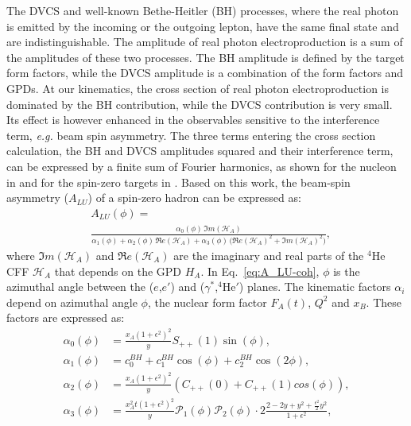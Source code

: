 \documentclass[twocolumn,nofootinbib,showpacs,prl,superscriptaddress,secnumarabic,amssymb,nobibnotes,aps,floatfix]{revtex4}
\begin{document}
The DVCS and well-known Bethe-Heitler (BH) processes, where the real 
photon is emitted by the incoming or the outgoing lepton, have the same final 
state and are indistinguishable. The amplitude of real photon 
electroproduction is a sum of the amplitudes of these two processes. The BH 
amplitude is defined by the target form factors, while the DVCS amplitude is 
a combination of the form factors and GPDs. At our kinematics, the cross 
section of real photon electroproduction is dominated by the BH 
contribution, while the DVCS contribution is very small. Its effect is however
enhanced in the observables sensitive to the interference term, {\it e.g.} 
beam spin asymmetry. The three terms entering the cross section calculation, the 
BH and DVCS amplitudes squared and their interference term, 
can be expressed by a finite sum of Fourier harmonics, as shown for the nucleon 
in \cite{Belitsky:2001ns} and for the spin-zero targets in 
\cite{Kirchner:2003wt,Belitsky:2008bz}. Based on this work, the beam-spin 
asymmetry ($A_{LU}$) of a spin-zero hadron can be expressed as:
\begin{equation}
\begin{split}
&A_{LU}(\phi) = \\
&\frac{\alpha_{0}(\phi) \, \Im m(\mathcal{H}_{A})}
{\alpha_{1}(\phi) + \alpha_{2}(\phi) \, \Re e(\mathcal{H}_{A}) + \alpha_{3}(\phi) \, 
\big( \Re e(\mathcal{H}_{A})^{2} + \Im m(\mathcal{H}_{A})^{2} \big)},
\end{split}
\label{eq:A_LU-coh}
\end{equation}
where $\Im m(\mathcal{H}_{A})$ and $\Re e(\mathcal{H}_{A})$ are the imaginary 
and real parts of the $^4$He CFF $\mathcal{H}_{A}$ that depends on the GPD 
$H_A$. In Eq.~\ref{eq:A_LU-coh}, $\phi$ is the azimuthal angle between the 
($e$,$e'$) and ($\gamma^{*}$,$^4$He$'$) planes. The kinematic factors $\alpha_i$
depend on azimuthal angle $\phi$, the nuclear form factor 
$F_A(t)$, $Q^2$ and $x_B$. These factors are expressed as:
\begin{align}
   \alpha_0 (\phi) & = \frac{x_{A}(1+\epsilon^2)^2}{y} S_{++}(1) \sin(\phi), \\
   \alpha_1 (\phi) & = c_0^{BH}+c_1^{BH} \cos({\phi})+c_2^{BH} \cos(2\phi), \\ 
   \alpha_2 (\phi) & = \frac{x_{A}(1+\epsilon^2)^2}{y}  \left( 
      C_{++}(0) +  C_{++}(1) cos(\phi) \right), \\
   \alpha_3 (\phi) &= \frac{x^{2}_{A}t(1+\epsilon^2)^2}{y} {\mathcal P}_1(\phi) 
      {\mathcal P}_2(\phi) \cdot 2 \frac{2-2y+y^2 + \frac{\epsilon^2}{2}y^2}{1 + 
      \epsilon^2},
\end{align}
\end{document}

